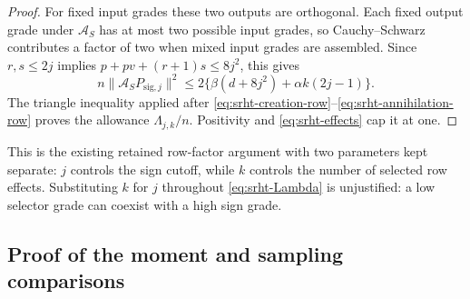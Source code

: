 \documentclass[11pt,a4paper]{article}
\theoremstyle{definition}\newtheorem{definition}[theorem]{Definition}
\theoremstyle{remark}\newtheorem{remark}[theorem]{Remark}
\newcommand{\norm}[1]{\lVert#1\rVert}\newcommand{\ip}[2]{\langle#1,#2\rangle}
\numberwithin{equation}{section}
\begin{document}
\begin{proof}
For fixed input grades these two outputs are orthogonal. Each fixed output
grade under $\mathcal A_S$ has at most two possible input grades, so
Cauchy--Schwarz contributes a factor of two when mixed input grades are
assembled. Since $r,s\le2j$ implies
$p+pv+(r+1)s\le8j^2$, this gives
\begin{equation}
 n\norm{\mathcal A_SP_{\mathrm{sig},j}}^2
    \le2\{\beta(d+8j^2)+\alpha k(2j-1)\}.
 \label{eq:srht-annihilation-row}
\end{equation}
The triangle inequality applied after
\eqref{eq:srht-creation-row}--\eqref{eq:srht-annihilation-row} proves
the allowance $\Lambda_{j,k}/n$. Positivity and
\eqref{eq:srht-effects} cap it at one.
\end{proof}

This is the existing retained row-factor argument with two parameters
kept separate: $j$ controls the sign cutoff, while $k$ controls the number
of selected row effects. Substituting $k$ for $j$ throughout
\eqref{eq:srht-Lambda} is unjustified: a low selector grade can coexist
with a high sign grade.

\subsection{Proof of the moment and sampling comparisons}
\end{document}
